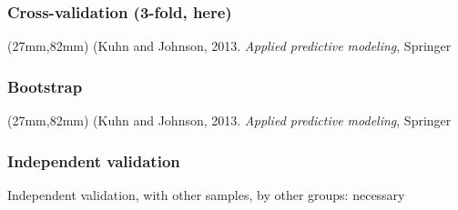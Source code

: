 \begin{frame}
  \frametitle{Cross-validation (3-fold, here)}
  \vspace*{-5cm}
  \begin{textblock*}{83mm}(27mm,82mm)
    {\tiny(Kuhn and Johnson, 2013. \textit{Applied predictive modeling}, Springer}
  \end{textblock*}
 
\end{frame}


\begin{frame}
  \frametitle{Bootstrap}
  \vspace*{-5cm}
  \begin{textblock*}{83mm}(27mm,82mm)
    {\tiny(Kuhn and Johnson, 2013. \textit{Applied predictive modeling}, Springer}
  \end{textblock*}
\end{frame}




\begin{frame}
\frametitle{Independent validation}
Independent validation, with other samples, by other groups: necessary
\end{frame}




